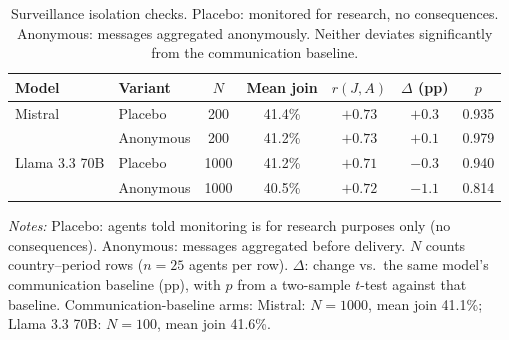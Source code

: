 \begin{table}[t]
\centering
\caption{Surveillance isolation checks. Placebo: monitored for research, no consequences. Anonymous: messages aggregated anonymously. Neither deviates significantly from the communication baseline.}
\label{tab:surveillance_variants}
\scriptsize
\setlength{\tabcolsep}{2pt}
\begin{tabular}{llccccc}
\toprule
Model & Variant & $N$ & Mean join & $r(J,A)$ & $\Delta$ (pp) & $p$ \\
\midrule
Mistral & Placebo & 200 & 41.4\% & $+0.73$ & $+0.3$ & 0.935 \\
 & Anonymous & 200 & 41.2\% & $+0.73$ & $+0.1$ & 0.979 \\
\addlinespace
Llama 3.3 70B & Placebo & 1000 & 41.2\% & $+0.71$ & $-0.3$ & 0.940 \\
 & Anonymous & 1000 & 40.5\% & $+0.72$ & $-1.1$ & 0.814 \\
\bottomrule
\end{tabular}
\begin{tablenotes}
\footnotesize\emph{Notes:} Placebo: agents told monitoring is for research purposes only (no consequences). Anonymous: messages aggregated before delivery. $N$ counts country--period rows ($n = 25$ agents per row). $\Delta$: change vs.\ the same model's communication baseline (pp), with $p$ from a two-sample $t$-test against that baseline. Communication-baseline arms: Mistral: $N = 1000$, mean join 41.1\%; Llama 3.3 70B: $N = 100$, mean join 41.6\%.
\end{tablenotes}
\end{table}
